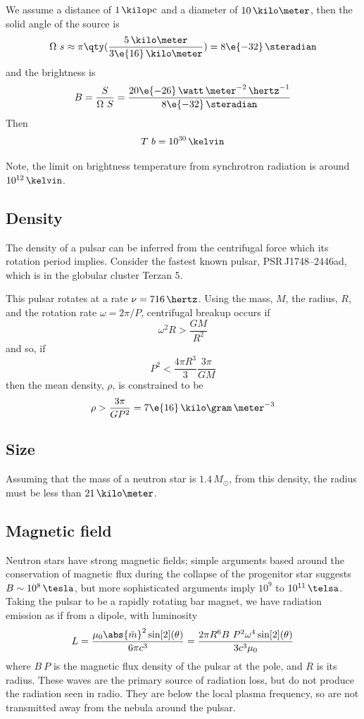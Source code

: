 \begin{example}
  We assume a distance of $1\,\kilo\text{pc}$ and a diameter of
  $10\,\kilo\meter$, then the solid angle of the source is
\[ \Omega~s \approx \pi \qty( \frac{5\,\kilo\meter}{3\e{16}\,\kilo\meter} ) = 8\e{-32}\,\steradian \]
and the brightness is
\[ B = \frac{S}{\Omega~S} = \frac{20\e{-26}\,\watt\,\meter^{-2}\,\hertz^{-1}}{8\e{-32}\,\steradian} \]
Then
\[ T~b = 10^{30}\,\kelvin \]
\end{example}
Note, the limit on brightness temperature from synchrotron radiation is around $10^{12}\,\kelvin$.

\subsection{Density}
\label{sec:density}

The density of a pulsar can be inferred from the centrifugal force
which its rotation period implies.  Consider the fastest known pulsar,
PSR\,J1748--2446ad, which is in the globular cluster Terzan 5.

\begin{example}
  This pulsar rotates at a rate $\nu = 716\,\hertz$. Using the mass,
  $M$, the radius, $R$, and the rotation rate $\omega = 2 \pi / P$,
  centrifugal breakup occurs if
\[ \omega^2 R > \frac{GM}{R^2} \]
and so, if 
\[ P^2 < \frac{4 \pi R^3}{3} \frac{3 \pi}{GM} \] then the mean
density, $\rho$, is constrained to be \[\rho > \frac{3 \pi}{GP^2} =
7\e{16}\,\kilo\gram\,\meter^{-3} \]
\end{example}

\subsection{Size}
\label{sec:size}

Assuming that the mass of a neutron star is $1.4\,M_{\odot}$, from
this density, the radius must be less than $21\,\kilo\meter$.

\subsection{Magnetic field}
\label{sec:magnetic-field}

Neutron stars have strong magnetic fields; simple arguments based
around the conservation of magnetic flux during the collapse of the
progenitor star suggests $B \sim 10^8\,\tesla$, but more sophisticated
arguments imply $10^9$ to $10^{11}\,\telsa$. Taking the pulsar to be a
rapidly rotating bar magnet, we have radiation emission as if from a
dipole, with luminosity
\begin{equation}
  \label{eq:90}
  L = \frac{\mu_0 \abs{\ddot{m}}^2 \sin[2](\theta)}{6 \pi c^3} = \frac{2 \pi R^6 B~P^2 \omega^4 \sin[2](\theta)}{3 c^3 \mu_0}
\end{equation}
where $B~P$ is the magnetic flux density of the pulsar at the pole,
and $R$ is its radius. These waves are the primary source of radiation
loss, but do not produce the radiation seen in radio. They are below
the local plasma frequency, so are not transmitted away from the
nebula around the pulsar.

